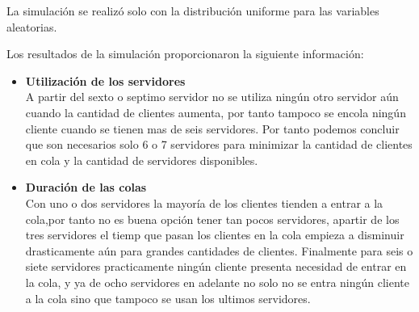 \documentclass[article]{amsart}
\begin{document}
La simulaci\'on se realiz\'o solo con la distribuci\'on uniforme para las variables aleatorias.

Los resultados de la simulación proporcionaron la siguiente información:

\begin{itemize}
\item \textbf{Utilizaci\'on de los servidores}\\
A partir del sexto o septimo servidor no se utiliza ning\'un otro servidor a\'un cuando la cantidad de clientes aumenta, por tanto tampoco se encola ning\'un cliente cuando se tienen mas de seis servidores. Por tanto podemos concluir que son necesarios solo 6 o 7 servidores para minimizar la cantidad de clientes en cola y la cantidad de servidores disponibles.\\
\item \textbf{Duraci\'on de las colas}\\
Con uno o dos servidores la mayor\'ia de los clientes tienden a entrar a la cola,por tanto no es buena opci\'on tener tan pocos servidores, apartir de los tres servidores el tiemp que pasan los clientes en la cola empieza a disminuir drasticamente a\'un para grandes cantidades de clientes. Finalmente para seis o siete servidores practicamente ning\'un cliente presenta necesidad de entrar en la cola, y ya de ocho servidores en adelante no solo no se entra ning\'un cliente a la cola sino que tampoco se usan los ultimos servidores.


\end{itemize}
\end{document}

